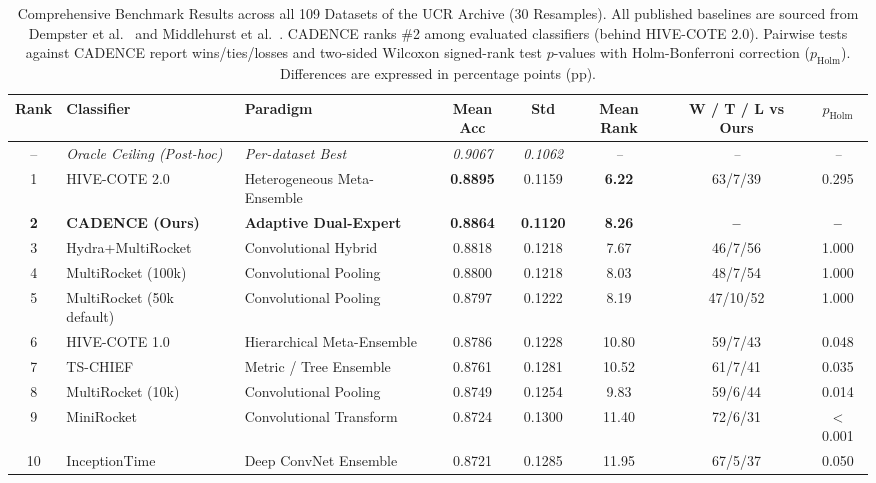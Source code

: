 \begin{table}[t]
\centering
\caption{Comprehensive Benchmark Results across all 109 Datasets of the UCR Archive (30 Resamples). All published baselines are sourced from Dempster et al.~\cite{dempster2023hydra} and Middlehurst et al.~\cite{middlehurst2021hive}. CADENCE ranks \#2 among evaluated classifiers (behind HIVE-COTE 2.0). Pairwise tests against CADENCE report wins/ties/losses and two-sided Wilcoxon signed-rank test $p$-values with Holm-Bonferroni correction ($p_{\text{Holm}}$). Differences are expressed in percentage points (pp).}
\label{tab:rankings}
\small
\begin{tabular}{cllccccc}
\toprule
\textbf{Rank} & \textbf{Classifier} & \textbf{Paradigm} & \textbf{Mean Acc} & \textbf{Std} & \textbf{Mean Rank} & \textbf{W / T / L vs Ours} & \textbf{$p_{\text{Holm}}$} \\
\midrule
-- & \textit{Oracle Ceiling (Post-hoc)} & \textit{Per-dataset Best} & \textit{0.9067} & \textit{0.1062} & \textit{--} & \textit{--} & \textit{--} \\
1 & HIVE-COTE 2.0~\cite{middlehurst2021hive} & Heterogeneous Meta-Ensemble & \textbf{0.8895} & 0.1159 & \textbf{6.22} & 63/7/39 & 0.295 \\
\textbf{2} & \textbf{CADENCE (Ours)} & \textbf{Adaptive Dual-Expert} & \textbf{0.8864} & \textbf{0.1120} & \textbf{8.26} & \textbf{--} & \textbf{--} \\
3 & Hydra+MultiRocket~\cite{dempster2023hydra} & Convolutional Hybrid & 0.8818 & 0.1218 & 7.67 & 46/7/56 & 1.000 \\
4 & MultiRocket (100k)~\cite{tan2022multirocket} & Convolutional Pooling & 0.8800 & 0.1218 & 8.03 & 48/7/54 & 1.000 \\
5 & MultiRocket (50k default)~\cite{tan2022multirocket} & Convolutional Pooling & 0.8797 & 0.1222 & 8.19 & 47/10/52 & 1.000 \\
6 & HIVE-COTE 1.0~\cite{lines2018hive} & Hierarchical Meta-Ensemble & 0.8786 & 0.1228 & 10.80 & 59/7/43 & 0.048 \\
7 & TS-CHIEF~\cite{shifaz2020tschief} & Metric / Tree Ensemble & 0.8761 & 0.1281 & 10.52 & 61/7/41 & 0.035 \\
8 & MultiRocket (10k)~\cite{tan2022multirocket} & Convolutional Pooling & 0.8749 & 0.1254 & 9.83 & 59/6/44 & 0.014 \\
9 & MiniRocket~\cite{dempster2021minirocket} & Convolutional Transform & 0.8724 & 0.1300 & 11.40 & 72/6/31 & < 0.001 \\
10 & InceptionTime~\cite{fawaz2020inceptiontime} & Deep ConvNet Ensemble & 0.8721 & 0.1285 & 11.95 & 67/5/37 & 0.050 \\

\end{tabular}
\end{table}
